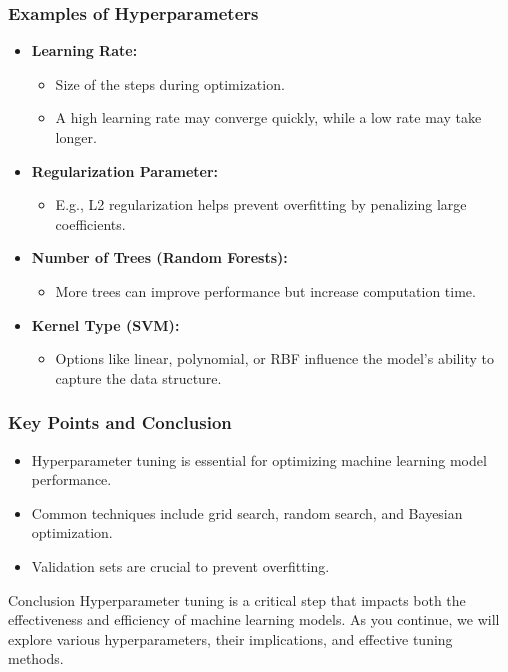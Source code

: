 \documentclass[aspectratio=169]{beamer}
\begin{document}
\begin{frame}[fragile]
    \frametitle{Examples of Hyperparameters}
    \begin{itemize}
        \item \textbf{Learning Rate:} 
            \begin{itemize}
                \item Size of the steps during optimization.
                \item A high learning rate may converge quickly, while a low rate may take longer.
            \end{itemize}
        
        \item \textbf{Regularization Parameter:} 
            \begin{itemize}
                \item E.g., L2 regularization helps prevent overfitting by penalizing large coefficients.
            \end{itemize}
        
        \item \textbf{Number of Trees (Random Forests):} 
            \begin{itemize}
                \item More trees can improve performance but increase computation time.
            \end{itemize}
        
        \item \textbf{Kernel Type (SVM):} 
            \begin{itemize}
                \item Options like linear, polynomial, or RBF influence the model's ability to capture the data structure.
            \end{itemize}
    \end{itemize}
\end{frame}

\begin{frame}[fragile]
    \frametitle{Key Points and Conclusion}
    \begin{itemize}
        \item Hyperparameter tuning is essential for optimizing machine learning model performance.
        \item Common techniques include grid search, random search, and Bayesian optimization.
        \item Validation sets are crucial to prevent overfitting.
    \end{itemize}
    
    \begin{block}{Conclusion}
        Hyperparameter tuning is a critical step that impacts both the effectiveness and efficiency of machine learning models. As you continue, we will explore various hyperparameters, their implications, and effective tuning methods.
    \end{block}
\end{frame}
\end{document}
